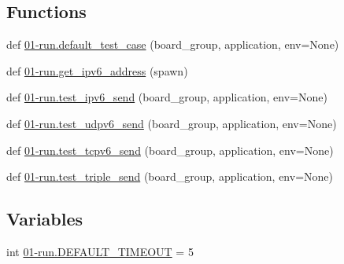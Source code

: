 \subsection*{Functions}
\begin{DoxyCompactItemize}
\item 
def \hyperlink{namespace01-run_ad8f8d1b62f5d6ce614a7956dc3a6ca40}{01-\/run.\+default\+\_\+test\+\_\+case} (board\+\_\+group, application, env=None)
\item 
def \hyperlink{namespace01-run_afbee4f06ec853d191a2876c017efcdcc}{01-\/run.\+get\+\_\+ipv6\+\_\+address} (spawn)
\item 
def \hyperlink{namespace01-run_a798e8a5d7092f930c4ca7ce48d658113}{01-\/run.\+test\+\_\+ipv6\+\_\+send} (board\+\_\+group, application, env=None)
\item 
def \hyperlink{namespace01-run_a498ff87ebeb18334cf6110214d60bb53}{01-\/run.\+test\+\_\+udpv6\+\_\+send} (board\+\_\+group, application, env=None)
\item 
def \hyperlink{namespace01-run_aa33fb8b27f2a329f22f50abe430854eb}{01-\/run.\+test\+\_\+tcpv6\+\_\+send} (board\+\_\+group, application, env=None)
\item 
def \hyperlink{namespace01-run_ae96b1a02460277a9a00628064721b4ae}{01-\/run.\+test\+\_\+triple\+\_\+send} (board\+\_\+group, application, env=None)
\end{DoxyCompactItemize}
\subsection*{Variables}
\begin{DoxyCompactItemize}
\item 
int \hyperlink{namespace01-run_aef2372a86df3a2d4d21068f27005d720}{01-\/run.\+D\+E\+F\+A\+U\+L\+T\+\_\+\+T\+I\+M\+E\+O\+UT} = 5
\end{DoxyCompactItemize}
